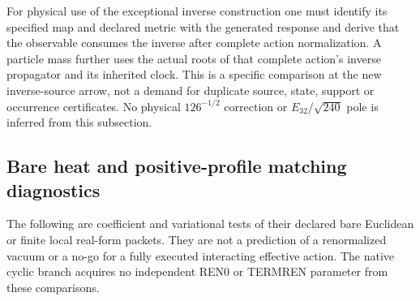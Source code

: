 \documentclass[11pt,a4paper]{article}
\begin{document}
For physical use of the exceptional inverse construction one must identify
its specified map and declared metric with the generated response and
derive that the observable consumes the inverse after complete action
normalization. A particle mass further uses the actual roots of that
complete action's inverse propagator and its inherited clock.
This is a specific comparison at the new inverse-source arrow, not
a demand for duplicate source, state, support or occurrence certificates.
No physical \(126^{-1/2}\) correction or \(E_{32}/\sqrt{240}\) pole
is inferred from this subsection.






\subsection{Bare heat and positive-profile matching diagnostics}
\label{p3f:app:v2216-bare-matching}

The following are coefficient and variational tests of their declared
bare Euclidean or finite local real-form packets.  They are not a
prediction of a renormalized vacuum or a no-go for a fully executed
interacting effective action.  The native cyclic branch acquires no
independent REN0 or TERMREN parameter from these comparisons.
\end{document}
